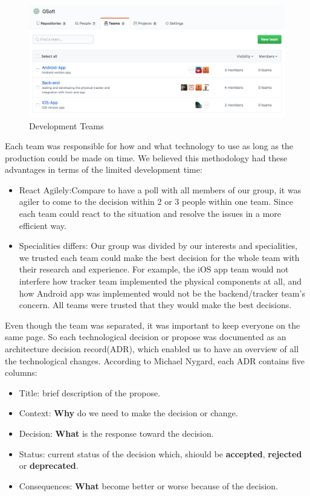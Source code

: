 \documentclass[12pt,a4paper]{article}
\begin{document}
        \begin{figure}[H]
          \centering
          \includegraphics[width=1\textwidth]{../assets/development-records-teams.png}
          \caption{Development Teams}
          \label{fig:Development Teams}
        \end{figure}

        Each team was responsible for how and what technology to use as long as the production could be made on time. We believed this methodology had these advantages in terms of the limited development time:

        \begin{itemize}
          \item {React Agilely}:Compare to have a poll with all members of our group, it was agiler to come to the decision within 2 or 3 people within one team. Since each team could react to the situation and resolve the issues in a more efficient way.
          \item {Specialities differs}: Our group was divided by our interests and specialities, we trusted each team could make the best decision for the whole team with their research and experience. For example, the iOS app team would not interfere how tracker team implemented the physical components at all, and how Android app was implemented would not be the backend/tracker team's concern. All teams were trusted that they would make the best decisions.
        \end{itemize}
        
        Even though the team was separated, it was important to keep everyone on the same page. So each technological decision or propose was documented as an architecture decision record(ADR), which enabled us to have an overview of all the technological changes. According to Michael Nygard, each ADR contains five columns\cite{ArchitectureDecisionRecord}: 

        \begin{itemize}
          \item Title: brief description of the propose.
          \item Context: {\bf Why} do we need to make the decision or change.                   
          \item Decision: {\bf What} is the response toward the decision.
          \item Status: current status of the decision which, shiould be {\bf accepted}, {\bf rejected} or {\bf deprecated}.
          \item Consequences: {\bf What} become better or worse because of the decision.
        \end{itemize}
\end{document}
